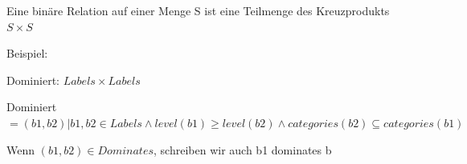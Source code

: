 \documentclass[a4paper]{article}
\begin{document}
\begin{multicols}{3}
\begin{itemize*}
            \begin{itemize*}
                  \item Eine binäre Relation auf einer Menge S ist eine Teilmenge des Kreuzprodukts $S\times S$
                  \item Beispiel:
                  \begin{itemize*}
                        \item Dominiert: $Labels \times Labels$
                        \item Dominiert $={(b1,b2) | b1, b2 \in Labels \wedge level(b1) \geq level(b2) \wedge categories(b2) \subseteq categories(b1)}$
                        \item Wenn $(b1, b2) \in Dominates$, schreiben wir auch b1 dominates b
                  \end{itemize*}
            \end{itemize*}
      \end{itemize*}


\end{multicols}
\end{document}

